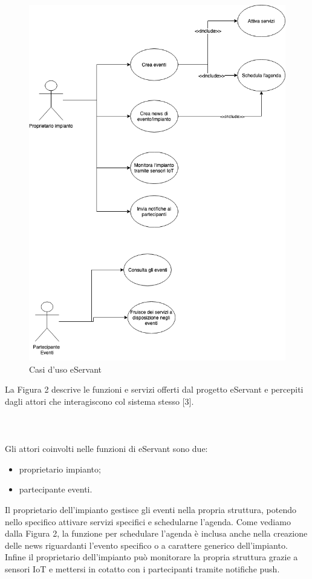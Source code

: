 \begin{figure}[h!]
    \centering  
    \caption{Casi d'uso eServant}
    \includegraphics[scale=0.5]{img/cap1/casidiuso}
\end{figure}
La Figura 2 descrive le funzioni e servizi offerti dal progetto eServant e percepiti dagli attori che interagiscono col sistema stesso [3].
\\\\\\\\Gli attori coinvolti nelle funzioni di eServant sono due:
\begin{itemize}
    \item proprietario impianto;
    \item partecipante eventi.
\end{itemize}

Il proprietario dell'impianto gestisce gli eventi nella propria struttura, potendo nello specifico attivare servizi specifici e schedularne l'agenda.
Come vediamo dalla Figura 2, la funzione per schedulare l'agenda è inclusa anche nella creazione delle news riguardanti l'evento specifico o a
carattere generico dell'impianto.
Infine il proprietario dell'impianto può monitorare la propria struttura grazie a sensori IoT e mettersi in cotatto con i partecipanti tramite notifiche push.

